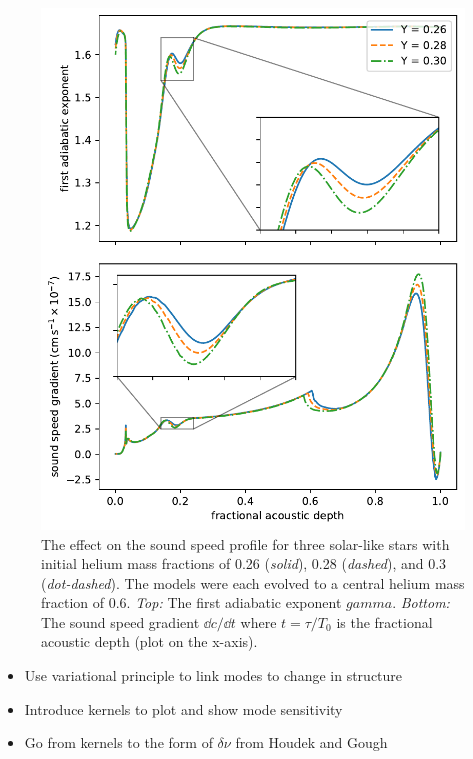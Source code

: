 \begin{figure}
    \centering
    \includegraphics{figures/helium-ionisation-sound-speed.pdf}
    \caption{The effect on the sound speed profile for three solar-like stars with initial helium mass fractions of 0.26 (\emph{solid}), 0.28 (\emph{dashed}), and 0.3 (\emph{dot-dashed}). The models were each evolved to a central helium mass fraction of 0.6. \emph{Top:} The first adiabatic exponent \(gamma\). \emph{Bottom:} The sound speed gradient \(\dd c/\dd t\) where \(t = \tau/T_0\) is the fractional acoustic depth (plot on the x-axis).}
    \label{fig:gamma-sound-speed}
\end{figure}


\begin{itemize}
    \color{red}
    \item Use variational principle to link modes to change in structure
    \item Introduce kernels to plot and show mode sensitivity
    \item Go from kernels to the form of \(\delta\nu\) from Houdek and Gough
\end{itemize}


